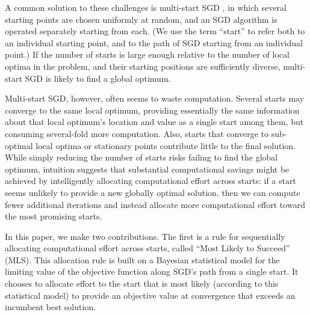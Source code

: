 \documentclass[12pt,english]{article}
\newcommand{\abbrv}{MLS}
\newcommand{\name}{Most Likely to Succeed}
\begin{document}
A common solution to these challenges is multi-start SGD \citep{schoen:1991,marti:2016}, in which several starting points are chosen uniformly at random, and an SGD algorithm is operated separately starting from each.
(We use the term ``start'' to refer both to an individual starting point, and to the path of SGD starting from an individual point.)
If the number of starts is large enough relative to the number of local optima in the problem, and their starting positions are sufficiently diverse, multi-start SGD is likely to find a global optimum.  

Multi-start SGD, however, often seems to waste computation.  Several starts may converge to the same local optimum, providing essentially the same information about that local optimum's location and value as a single start among them, but consuming several-fold more computation. Also, starts that converge to sub-optimal local optima or stationary points contribute little to the final solution.
While simply reducing the number of starts risks failing to find the global optimum, intuition suggests that substantial computational savings might be achieved by intelligently allocating computational effort across starts: if a start seems unlikely to provide a new globally optimal solution, then we can compute fewer additional iterations and instead allocate more computational effort toward the most promising starts.


In this paper, we make two contributions. The first is a rule for sequentially allocating computational effort across starts, called ``\name'' (\abbrv).  This allocation rule is built on a Bayesian statistical model for the limiting value of the objective function along SGD's path from a single start.  It chooses to allocate effort to the start that is most likely (according to this statistical model) to provide an objective value at convergence that exceeds an incumbent best solution.

\end{document}
